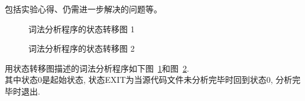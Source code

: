 包括实验心得、仍需进一步解决的问题等。
\begin{figure}
  \begin{center}
  \end{center}
  \caption{词法分析程序的状态转移图 1}
  \label{fig:StateFig1}
\end{figure}

\begin{figure}
  \begin{center}
  \end{center}
  \caption{词法分析程序的状态转移图 2}
  \label{fig:StateFig2}
\end{figure}
用状态转移图描述的词法分析程序如下图~\ref{fig:StateFig1}和图~\ref{fig:StateFig2}. \\
其中状态0是起始状态, 状态EXIT为当源代码文件未分析完毕时回到状态0, 分析完毕时退出.
